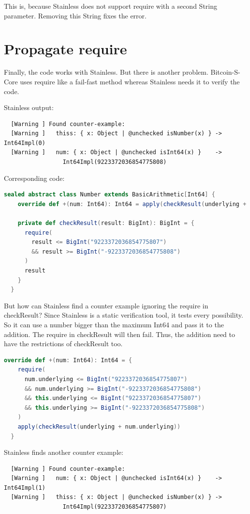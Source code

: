 This is, because Stainless does not support require with a second String parameter.
Removing this String fixes the error.

\section{Propagate require}
Finally, the code works with Stainless.
But there is another problem.
Bitcoin-S-Core uses require like a fail-fast method whereas Stainless needs it to verify the code.

Stainless output:
{\footnotesize\begin{verbatim}
  [Warning ] Found counter-example:
  [Warning ]   thiss: { x: Object | @unchecked isNumber(x) } -> Int64Impl(0)
  [Warning ]   num: { x: Object | @unchecked isInt64(x) }    -> 
                 Int64Impl(9223372036854775808)
\end{verbatim}}

Corresponding code:
\begin{lstlisting}[language=scala]
  sealed abstract class Number extends BasicArithmetic[Int64] {
    override def +(num: Int64): Int64 = apply(checkResult(underlying + num.underlying))

    private def checkResult(result: BigInt): BigInt = {
      require(
        result <= BigInt("9223372036854775807")
        && result >= BigInt("-9223372036854775808")
      )
      result
    }
  }
\end{lstlisting}

But how can Stainless find a counter example ignoring the require in checkResult?
Since Stainless is a static verification tool, it tests every possibility.
So it can use a number bigger than the maximum Int64 and pass it to the addition.
The require in checkResult will then fail.
Thus, the addition need to have the restrictions of checkResult too.
\begin{lstlisting}[language=scala]
  override def +(num: Int64): Int64 = {
    require(
      num.underlying <= BigInt("9223372036854775807")
      && num.underlying >= BigInt("-9223372036854775808")
      && this.underlying <= BigInt("9223372036854775807")
      && this.underlying >= BigInt("-9223372036854775808")
    )
    apply(checkResult(underlying + num.underlying))
  }
\end{lstlisting}

Stainless finds another counter example:
{\footnotesize\begin{verbatim}
  [Warning ] Found counter-example:
  [Warning ]   num: { x: Object | @unchecked isInt64(x) }    -> Int64Impl(1)
  [Warning ]   thiss: { x: Object | @unchecked isNumber(x) } ->
                 Int64Impl(9223372036854775807)
\end{verbatim}}

